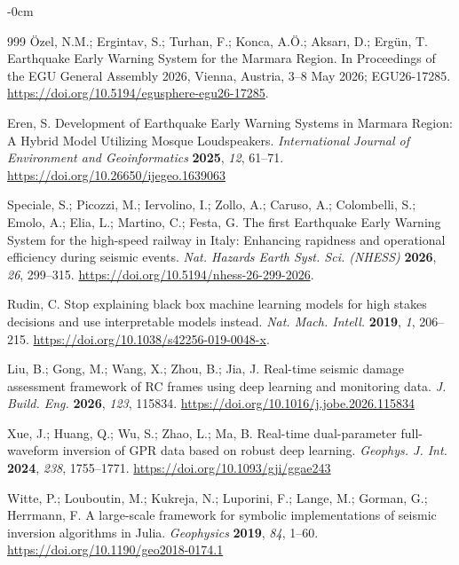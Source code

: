 \documentclass[data,article,accept,pdftex,moreauthors]{Definitions/mdpi}
\begin{document}
\begin{adjustwidth}{-\extralength}{0cm}
\begin{thebibliography}{999}
Özel, N.M.; Ergintav, S.; Turhan, F.; Konca, A.Ö.; Aksarı, D.; Ergün, T. Earthquake Early Warning System for the Marmara Region. In Proceedings of the EGU General Assembly 2026, Vienna, Austria, 3--8 May 2026; %
 EGU26-17285. \url{https://doi.org/10.5194/egusphere-egu26-17285}.

Eren, S. Development of Earthquake Early Warning Systems in Marmara Region: A Hybrid Model Utilizing Mosque Loudspeakers. \emph{International Journal of Environment and Geoinformatics} \textbf{2025}, \emph{12}, 61--71. \url{https://doi.org/10.26650/ijegeo.1639063}%

Speciale, S.; Picozzi, M.; Iervolino, I.; Zollo, A.; Caruso, A.; Colombelli, S.; Emolo, A.; Elia, L.; Martino, C.; Festa, G. The first Earthquake Early Warning System for the high-speed railway in Italy: Enhancing rapidness and operational efficiency during seismic events. \emph{Nat. Hazards Earth Syst. Sci. (NHESS)} \textbf{2026}, \emph{26}, 299--315. \url{https://doi.org/10.5194/nhess-26-299-2026}.

Rudin, C. Stop explaining black box machine learning models for high stakes decisions and use interpretable models instead. \emph{Nat. Mach. Intell.} \textbf{2019}, \emph{1}, 206--215. \url{https://doi.org/10.1038/s42256-019-0048-x}.

Liu, B.; Gong, M.; Wang, X.; Zhou, B.; Jia, J. Real-time seismic damage assessment framework of RC frames using deep learning and monitoring data. \emph{J. Build. Eng.} \textbf{2026}, \emph{123}, 115834. \url{https://doi.org/10.1016/j.jobe.2026.115834}

Xue, J.; Huang, Q.; Wu, S.; Zhao, L.; Ma, B. Real-time dual-parameter full-waveform inversion of GPR data based on robust deep learning. \emph{Geophys. J. Int.} \textbf{2024}, \emph{238}, 1755--1771. \url{https://doi.org/10.1093/gji/ggae243}

Witte, P.; Louboutin, M.; Kukreja, N.; Luporini, F.; Lange, M.; Gorman, G.; Herrmann, F. A large-scale framework for symbolic implementations of seismic inversion algorithms in Julia. \emph{Geophysics} \textbf{2019}, \emph{84}, 1--60. \url{https://doi.org/10.1190/geo2018-0174.1}


\end{thebibliography}
\end{adjustwidth}
\end{document}
